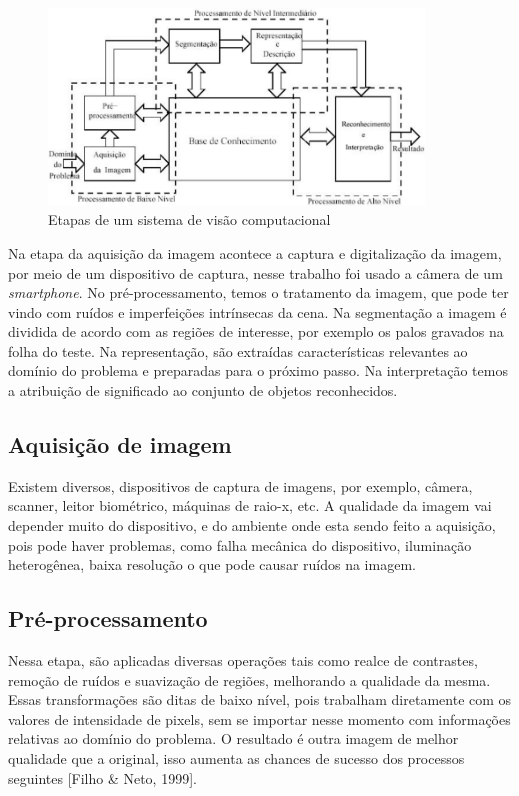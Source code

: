 \begin{figure}[H]
 \centering
 \includegraphics[width=0.89\textwidth]{./fig/fundamentacao/pdi2}
 \caption{Etapas de um sistema de visão computacional}
 \label{fig:imgpdi}
\end{figure}

Na etapa da aquisição da imagem acontece a captura e digitalização da imagem, por meio de um dispositivo de captura, nesse trabalho foi usado a câmera de um \textit{smartphone}. No pré-processamento, temos o tratamento da imagem, que pode ter vindo com ruídos e imperfeições intrínsecas da cena.  Na segmentação a imagem é dividida de acordo com as regiões de interesse, por exemplo os palos gravados na folha do teste. Na representação, são extraídas características relevantes ao domínio do problema e preparadas para o próximo passo. Na interpretação temos a atribuição de significado ao conjunto de objetos reconhecidos. 

\subsection{Aquisição de imagem}
\label{sub:aquis}

Existem diversos, dispositivos de captura de imagens, por exemplo, câmera, scanner, leitor biométrico, máquinas de raio-x, etc. A qualidade da imagem vai depender muito do dispositivo, e do ambiente onde esta sendo feito a aquisição, pois pode haver problemas, como falha mecânica do dispositivo, iluminação heterogênea, baixa resolução o que pode causar ruídos na imagem.

\subsection{Pré-processamento}
\label{sub:pre-process}

Nessa etapa, são aplicadas diversas operações tais como realce de contrastes, remoção de ruídos e suavização de regiões, melhorando a qualidade da mesma. Essas transformações são ditas de baixo nível, pois trabalham diretamente com os valores de intensidade de pixels, sem se importar nesse momento com informações relativas ao domínio do problema. O resultado é outra imagem de melhor qualidade que a original, isso aumenta as chances de sucesso dos processos seguintes [Filho & Neto, 1999].

